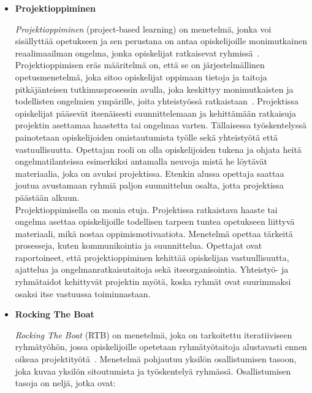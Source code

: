 \documentclass[finnish]{../tktltiki2}
\theoremstyle{definition}
\theoremstyle{remark}
\begin{document}
\begin{itemize}

\item {\bf Projektioppiminen}

\emph{Projektioppiminen} (project-based learning) on menetelmä, jonka voi sisällyttää opetukseen ja sen perustana on
antaa opiskelijoille monimutkainen reaalimaailman ongelma, jonka opiskelijat
ratkaisevat ryhmissä~\cite{Jun:2010,Larmer:2009,Markham:2003}. Projektioppimisen eräs määritelmä on, että se on järjestelmällinen
opetusmenetelmä, joka sitoo opiskelijat oppimaan tietoja ja taitoja pitkäjänteisen tutkimusprosessin
avulla, joka keskittyy monimutkaisten ja todellisten ongelmien ympärille, joita yhteistyössä
ratkaistaan~\cite{Markham:2003}. Projektissa opiskelijat pääsevät itsenäisesti suunnittelemaan ja kehittämään
ratkaisuja projektin asettamaa haastetta tai ongelmaa varten. Tällaisessa työskentelyssä painotetaan opiskelijoiden omistautumista
työlle sekä yhteistyötä että vastuullisuutta. Opettajan rooli on olla opiskelijoiden tukena ja ohjata heitä
ongelmatilanteissa esimerkiksi antamalla neuvoja mistä he löytävät materiaalia, joka on avuksi projektissa.
Etenkin alussa opettaja saattaa joutua avustamaan ryhmiä paljon suunnittelun osalta, jotta projektissa päästään alkuun.\\

Projektioppimisella on monia etuja. Projektissa ratkaistava haaste tai ongelma asettaa opiskelijoille
todellisen tarpeen tuntea opetukseen liittyvä materiaali, mikä nostaa oppimismotivaatiota. Menetelmä opettaa
tärkeitä prosesseja, kuten kommunikointia ja suunnittelua. Opettajat ovat raportoineet, että projektioppiminen
kehittää opiskelijan vastuullisuutta, ajattelua ja ongelmanratkaisutaitoja sekä itseorganisointia. Yhteistyö-
ja ryhmätaidot kehittyvät projektin myötä, koska ryhmät ovat suurimmaksi osaksi itse vastuussa toiminnastaan.

\item {\bf Rocking The Boat}

\enlargethispage{\baselineskip}

\emph{Rocking The Boat} (RTB) on menetelmä, joka on tarkoitettu
iteratiiviseen ryhmätyöhön, jossa opiskelijoille opetetaan ryhmätyötaitoja alustavasti ennen oikeaa projektityötä~\cite{Pieterse:2012:PPS:2157136.2157218}. Menetelmä pohjautuu yksilön osallistumisen tasoon, joka kuvaa yksilön sitoutumista ja työskentelyä ryhmässä. Osallistumisen tasoja on neljä, jotka ovat:

\begin{enumerate}


\end{enumerate}
\end{itemize}
\end{document}
